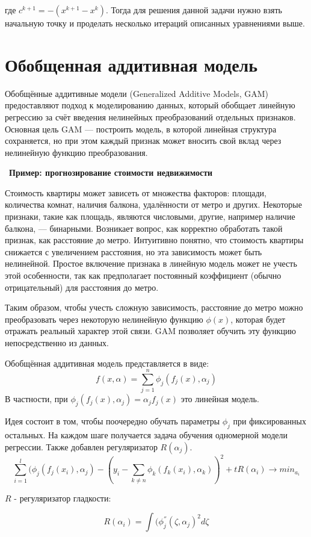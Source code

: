 {где \( c^{k + 1} = -(x^{k + 1} - x^{k})\). Тогда для решения данной задачи нужно взять начальную точку и проделать несколько итераций описанных уравнениями выше.

\section{Обобщенная аддитивная модель}

Обобщённые аддитивные модели (Generalized Additive Models, GAM) предоставляют подход к моделированию данных, который обобщает линейную регрессию за счёт введения нелинейных преобразований отдельных признаков. Основная цель GAM — построить модель, в которой линейная структура сохраняется, но при этом каждый признак может вносить свой вклад через нелинейную функцию преобразования.

\
\textbf{Пример: прогнозирование стоимости недвижимости}

Стоимость квартиры может зависеть от множества факторов: площади, количества комнат, наличия балкона, удалённости от метро и других. Некоторые признаки, такие как площадь, являются числовыми, другие, например наличие балкона, — бинарными. Возникает вопрос, как корректно обработать такой признак, как расстояние до метро. Интуитивно понятно, что стоимость квартиры снижается с увеличением расстояния, но эта зависимость может быть нелинейной. Простое включение признака в линейную модель может не учесть этой особенности, так как предполагает постоянный коэффициент (обычно отрицательный) для расстояния до метро.

Таким образом, чтобы учесть сложную зависимость, расстояние до метро можно преобразовать через некоторую нелинейную функцию $\phi(x)$, которая будет отражать реальный характер этой связи. GAM позволяет обучить эту функцию непосредственно из данных.


Обобщённая аддитивная модель представляется в виде:
$$f(x, \alpha) = \sum_{j=1}^{n}\phi_j(f_j(x), \alpha_j)$$
В частности, при $\phi_j(f_j(x), \alpha_j) = \alpha_jf_j(x)$ это линейная модель.

Идея состоит в том, чтобы поочередно обучать параметры $\phi_j$ при фиксированных остальных. На каждом шаге получается задача обучения одномерной модели регрессии. Также добавлен регуляризатор $R(\alpha_j)$.
$$\sum_{i=1}^{l}(\phi_j(f_j(x_i), \alpha_j) - (y_i - \sum_{k \neq n}\phi_k(f_k(x_i), \alpha_k))^2 + tR(\alpha_i) \to min_{a_i}$$

$R$ - регуляризатор гладкости:  

$$R(\alpha_i) = \int(\phi_j^{''}(\zeta, \alpha_j)^2d\zeta$$

}
